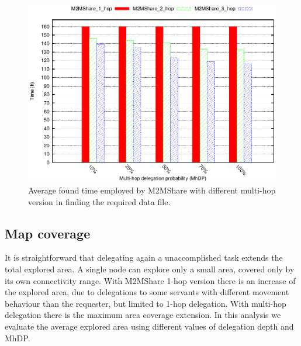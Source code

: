 \begin{figure}[htpb]
  \begin{center}
    \includegraphics{grafici/tempiVF_MultiHop.eps}
    \caption{Average found time employed by M2MShare with different multi-hop version in finding the required data file.}
    \label{fig:tempiVF_MultiHop}
  \end{center}
\end{figure}


\subsection{Map coverage}
It is straightforward that delegating again a unaccomplished task extends the total explored area. A single node can explore only a small area, covered only by its own connectivity range. With M2MShare 1-hop version there is an increase of the explored area, due to delegations to some servants with different movement behaviour than the requester, but limited to 1-hop delegation. With multi-hop delegation there is the maximum area coverage extension. In this analysis we evaluate the average explored area using different values of delegation depth and MhDP.

